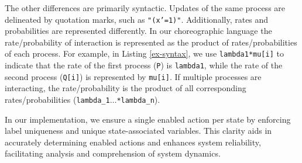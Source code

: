 The other differences are primarily syntactic. Updates of the same process are delineated by quotation marks, such as \texttt{"(x'=1)"}. Additionally, rates and probabilities are represented differently. In our choreographic language the rate/probability of interaction is represented as the product of rates/probabilities of each process. For example, in Listing \ref{ex-syntax}, we use \texttt{lambda1*mu[i]} to indicate that the rate of the first process (\texttt{P}) is \texttt{lambda1}, while the rate of the second process (\texttt{Q[i]}) is represented by \texttt{mu[i]}. If multiple processes are interacting, the rate/probability is the product of all corresponding rates/probabilities (\texttt{lambda\_1$\ldots$*lambda\_n}).

In our implementation, we ensure a single enabled action per state by enforcing label uniqueness and unique state-associated variables. This clarity aids in accurately determining enabled actions and enhances system reliability, facilitating analysis and comprehension of system dynamics.



